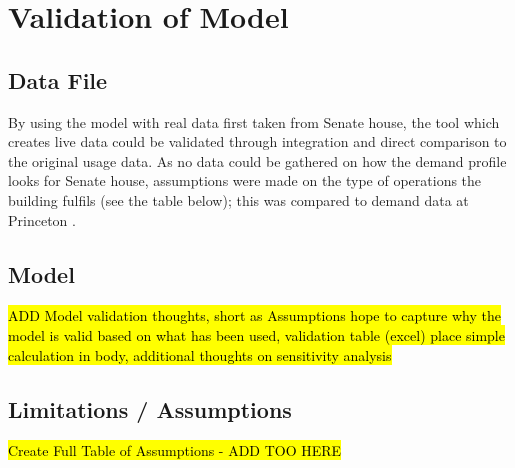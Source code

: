 \section{Validation of Model}\label{validation-of-model}

\subsection{Data File}\label{data-file}

By using the model with real data first taken from Senate house, the
tool which creates live data could be validated through integration and
direct comparison to the original usage data. As no data could be
gathered on how the demand profile looks for Senate house, assumptions
were made on the type of operations the building fulfils (see the table
below); this was compared to demand data at Princeton
\autocite{LiveData90:online}.

\subsection{Model}\label{model}

\hl{ADD Model validation thoughts, short as Assumptions hope to capture why the model is valid based on what has been used, validation table (excel) place simple calculation in body, additional thoughts on sensitivity analysis}

\subsection{Limitations / Assumptions}\label{limitations-assumptions}

\hl{Create Full Table of Assumptions - ADD TOO HERE}

